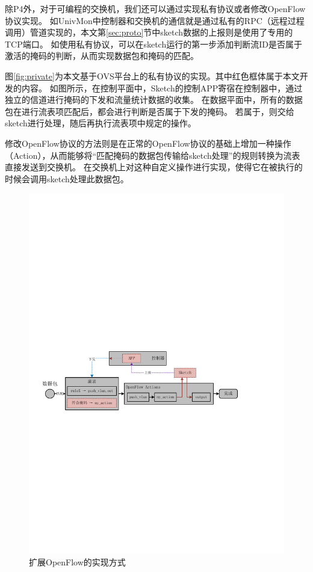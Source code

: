 除P4外，对于可编程的交换机，我们还可以通过实现私有协议或者修改OpenFlow协议实现。
如UnivMon\cite{liu2016one}中控制器和交换机的通信就是通过私有的RPC（远程过程调用）管道实现的，本文第\ref{sec:proto}节中sketch数据的上报则是使用了专用的TCP端口。
如使用私有协议，可以在sketch运行的第一步添加判断流ID是否属于激活的掩码的判断，从而实现数据包和掩码的匹配。

图\ref{fig:private}为本文基于OVS平台上的私有协议的实现。其中红色框体属于本文开发的内容。
如图所示，在控制平面中，Sketch的控制APP寄宿在控制器中，通过独立的信道进行掩码的下发和流量统计数据的收集。
在数据平面中，所有的数据包在进行流表项匹配后，都会进行判断是否属于下发的掩码。
若属于，则交给sketch进行处理，随后再执行流表项中规定的操作。

修改OpenFlow协议的方法则是在正常的OpenFlow协议的基础上增加一种操作（Action），从而能够将“匹配掩码的数据包传输给sketch处理”的规则转换为流表直接发送到交换机。
在交换机上对这种自定义操作进行实现，使得它在被执行的时候会调用sketch处理此数据包。

\begin{figure}[ht]
	\centering
	\includegraphics[width=\textwidth]{fig/ofaction.pdf}
	\caption{扩展OpenFlow的实现方式}
	\label{fig:ofaction}
\end{figure}

